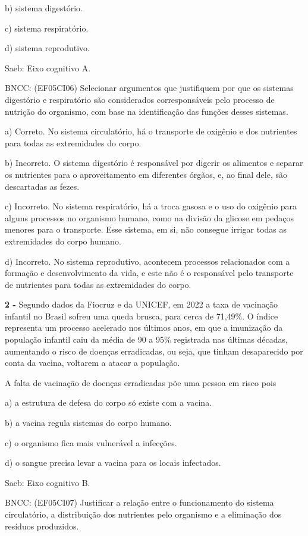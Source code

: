 b) sistema digestório.

c) sistema respiratório.

d) sistema reprodutivo.

Saeb: Eixo cognitivo A.

BNCC: (EF05CI06) Selecionar argumentos que justifiquem por que os
sistemas digestório e respiratório são considerados corresponsáveis pelo
processo de nutrição do organismo, com base na identificação das funções
desses sistemas.

a) Correto. No sistema circulatório, há o transporte de oxigênio e dos
nutrientes para todas as extremidades do corpo.

b) Incorreto. O sistema digestório é responsável por digerir os
alimentos e separar os nutrientes para o aproveitamento em diferentes
órgãos, e, ao final dele, são descartadas as fezes.

c) Incorreto. No sistema respiratório, há a troca gasosa e o uso do
oxigênio para alguns processos no organismo humano, como na divisão da
glicose em pedaços menores para o transporte. Esse sistema, em si, não
consegue irrigar todas as extremidades do corpo humano.

d) Incorreto. No sistema reprodutivo, acontecem processos relacionados
com a formação e desenvolvimento da vida, e este não é o responsável
pelo transporte de nutrientes para todas as extremidades do corpo.

\textbf{2 -} Segundo dados da Fiocruz e da UNICEF, em 2022 a taxa de
vacinação infantil no Brasil sofreu uma queda brusca, para cerca de
71,49\%. O índice representa um processo acelerado nos últimos anos, em
que a imunização da população infantil caiu da média de 90 a 95\%
registrada nas últimas décadas, aumentando o risco de doenças
erradicadas, ou seja, que tinham desaparecido por conta da vacina,
voltarem a atacar a população.

A falta de vacinação de doenças erradicadas põe uma pessoa em risco pois

a) a estrutura de defesa do corpo só existe com a vacina.

b) a vacina regula sistemas do corpo humano.

c) o organismo fica mais vulnerável a infecções.

d) o sangue precisa levar a vacina para os locais infectados.

Saeb: Eixo cognitivo B.

BNCC: (EF05CI07) Justificar a relação entre o funcionamento do sistema
circulatório, a distribuição dos nutrientes pelo organismo e a
eliminação dos resíduos produzidos.

